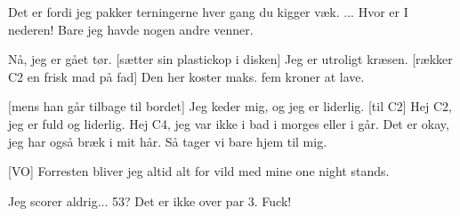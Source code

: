\documentclass[a4paper,11pt]{article}
\begin{document}
\begin{sketch}
     Det er fordi jeg pakker terningerne hver gang du kigger væk.
     ... Hvor er I nederen! Bare jeg havde nogen andre venner.

     Nå, jeg er gået tør.
    [sætter sin plastickop i disken] Jeg er utroligt kræsen.
    [rækker C2 en frisk mad på fad] Den her koster maks. fem kroner at lave.
    
    [mens han går tilbage til bordet] Jeg keder mig, og jeg er liderlig.
    [til C2] Hej C2, jeg er fuld og liderlig.
     Hej C4, jeg var ikke i bad i morges eller i går.
     Det er okay, jeg har også bræk i mit hår.
     Så tager vi bare hjem til mig.

    [VO] Forresten bliver jeg altid alt for vild med mine one night stands.

     Jeg scorer aldrig... 53?
     Det er ikke over par 3.
     Fuck!

\end{sketch}
\end{document}
